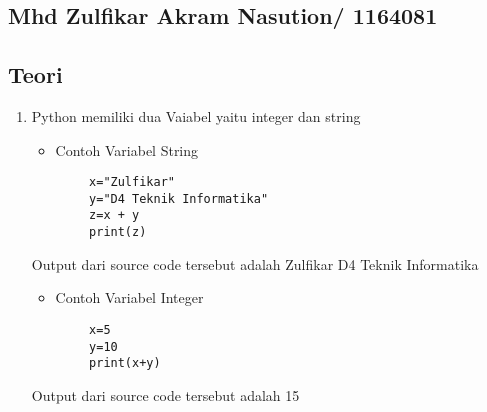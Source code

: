 \begin{enumerate}
\section{Mhd Zulfikar Akram Nasution/ 1164081}
\subsection{Teori}

\begin{enumerate}

\item Python memiliki dua Vaiabel yaitu integer dan string
	\begin{itemize}
	\item Contoh Variabel String
	\end{itemize}
	\begin{verbatim}
		x="Zulfikar"
		y="D4 Teknik Informatika"
		z=x + y
		print(z)
	\end{verbatim}
	\subitem Output dari source code tersebut adalah Zulfikar D4 Teknik Informatika
	\begin{itemize}	
	\item Contoh Variabel Integer
	\end{itemize}	
	\begin{verbatim}
		x=5
		y=10
		print(x+y)
	\end{verbatim}
	\subitem Output dari source code tersebut adalah 15


\end{enumerate}
\end{enumerate}
